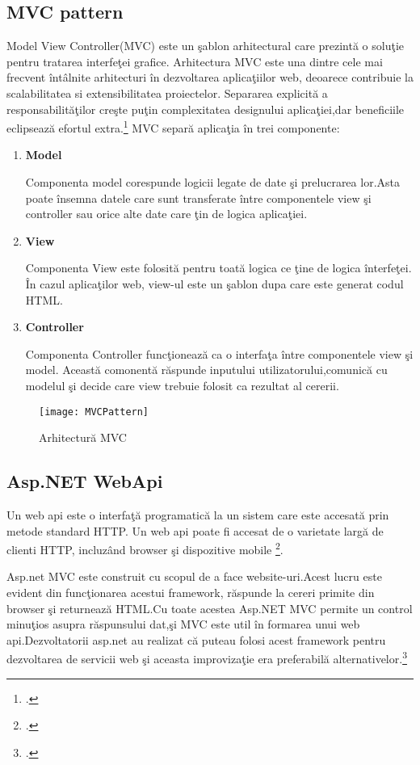 \documentclass[a4paper,12pt]{report}
\begin{document}
\subsection{MVC pattern}
Model View Controller(MVC) este un \c sablon arhitectural care prezint\u a o solu\c tie pentru tratarea interfe\c tei grafice.
Arhitectura MVC este una dintre cele mai frecvent \^int\^alnite arhitecturi \^in dezvoltarea aplica\c tiilor web, deoarece
contribuie la scalabilitatea si extensibilitatea proiectelor. Separarea explicit\u a a responsabilit\u a\c tilor
cre\c ste pu\c tin complexitatea designului aplica\c tiei,dar beneficiile eclipseaz\u a efortul extra.\footcite{proAspNetMVC5Pattern}
MVC separ\u a aplica\c tia \^in trei componente:
\begin{enumerate}
	\item \textbf{Model}

		Componenta model corespunde logicii legate de date \c si prelucrarea lor.Asta poate \^insemna
		datele care sunt transferate \^intre componentele view \c si controller sau orice alte date care \c tin de
		logica aplica\c tiei.
	\item \textbf{View}

		Componenta View este folosit\u a pentru toat\u a logica ce \c tine de logica \^ interfe\c tei.
		\^In cazul aplica\c tilor web, view-ul este un \c sablon dupa care este generat codul HTML.
	\item \textbf{Controller}

		Componenta Controller func\c tioneaz\u a ca o interfa\c ta \^intre componentele view \c si model.
		Aceast\u a comonent\u a r\u aspunde inputului utilizatorului,comunic\u a cu modelul \c si decide 
		care view trebuie folosit ca rezultat al cererii.
\end{enumerate}
\begin{figure}[!htb]
	\texttt{[image: MVCPattern]}
	\caption{Arhitectur\u a MVC}
	\label{fig:MVCPattern}
\end{figure}
\subsection{Asp.NET WebApi}
Un web api este o interfa\c t\u a programatic\u a la un sistem care este accesat\u a prin metode standard HTTP.
Un web api poate fi accesat de o varietate larg\u a de clienti HTTP, incluz\^and browser \c si dispozitive mobile \footcite{evolvableWebApi}.

Asp.net MVC este construit cu scopul de a face website-uri.Acest lucru este evident din func\c tionarea acestui framework,
r\u aspunde la cereri primite din browser \c si returneaz\u a HTML.Cu toate acestea Asp.NET MVC permite un control minu\c tios
asupra r\u aspunsului dat,\c si MVC este util \^in formarea unui web api.Dezvoltatorii asp.net au realizat c\u a puteau folosi
acest framework pentru dezvoltarea de servicii web \c si aceasta improviza\c tie era preferabil\u a alternativelor.\footcite{proAspNetMVC5Asp}
\end{document}
